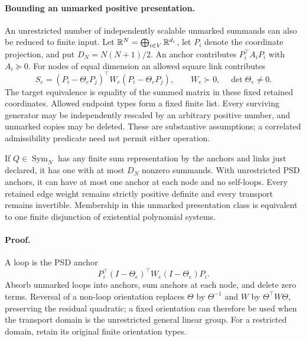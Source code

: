 \paragraph{Bounding an unmarked positive presentation.}
An unrestricted number of independently scalable unmarked
summands can also be reduced to finite input. Let
\(\mathbb R^N=\bigoplus_{i\in V}\mathbb R^{d_i}\), let \(P_i\) denote the
coordinate projection, and put \(D_N=N(N+1)/2\).
An anchor contributes \(P_i^\top A_iP_i\) with \(A_i\succeq0\).
For nodes of equal dimension an allowed square link contributes
\begin{equation}
S_e=(P_i-\Theta_eP_j)^\top W_e(P_i-\Theta_eP_j),
\qquad W_e\succ0,\quad\det\Theta_e\ne0.
\label{eq:cg-finite-pair-generator}
\end{equation}
The target equivalence is equality of the summed matrix in these
fixed retained coordinates. Allowed endpoint types form a fixed
finite list. Every surviving generator may be independently
rescaled by an arbitrary positive number, and unmarked copies
may be deleted. These are substantive assumptions; a correlated
admissibility predicate need not permit either operation.

If \(Q\in\operatorname{Sym}_N\) has any finite sum representation
by the anchors and links just declared, it has one with at most
\(D_N\) nonzero summands. With unrestricted PSD anchors, it can
have at most one anchor at each node and no self-loops.
Every retained edge weight remains strictly positive definite
and every transport remains invertible. Membership in this
unmarked presentation class is equivalent to one finite
disjunction of existential polynomial systems.

\paragraph{Proof.}
A loop is the PSD anchor
\[
P_i^\top(I-\Theta_e)^\top W_e(I-\Theta_e)P_i.
\]
Absorb unmarked loops into anchors, sum anchors at each node,
and delete zero terms. Reversal of a non-loop orientation
replaces \(\Theta\) by \(\Theta^{-1}\) and \(W\) by
\(\Theta^\top W\Theta\), preserving the residual quadratic;
a fixed orientation can therefore be used when the transport
domain is the unrestricted general linear group. For a
restricted domain, retain its original finite orientation types.


